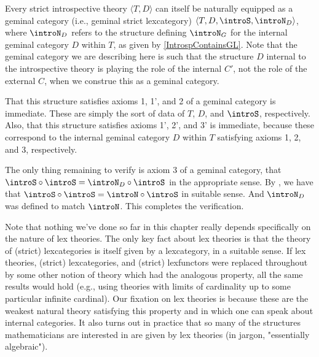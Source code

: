 \begin{construction}
Every strict introspective theory $\langle T, D \rangle$ can itself be naturally equipped as a geminal category (i.e., geminal strict lexcategory) $\langle T, D, \introS, \introN_{D} \rangle$, where $\introN_{D}$ refers to the structure defining $\introN_{G}$ for the internal geminal category $D$ within $T$, as given by \cref{IntrospContainsGL}. Note that the geminal category we are describing here is such that the structure $D$ internal to the introspective theory is playing the role of the internal $C'$, not the role of the external $C$, when we construe this as a geminal category.

That this structure satisfies axioms 1, 1', and 2 of a geminal category is immediate. These are simply the sort of data of $T$, $D$, and $\introS$, respectively. Also, that this structure satisfies axioms 1', 2', and 3' is immediate, because these correspond to the internal geminal category $D$ within $T$ satisfying axioms 1, 2, and 3, respectively.

The only thing remaining to verify is axiom 3 of a geminal category, that $\introS \circ \introS = \introN_{D} \circ \introS$ in the appropriate sense. By , we have that $\introS \circ \introS = \introN \circ \introS$ in suitable sense. And $\introN_{D}$ was defined to match $\introN$. This completes the verification.
\end{construction}

Note that nothing we've done so far in this chapter really depends specifically on the nature of lex theories. The only key fact about lex theories is that the theory of (strict) lexcategories is itself given by a lexcategory, in a suitable sense. If lex theories, (strict) lexcategories, and (strict) lexfunctors were replaced throughout by some other notion of theory which had the analogous property, all the same results would hold (e.g., using theories with limits of cardinality up to some particular infinite cardinal). Our fixation on lex theories is because these are the weakest natural theory satisfying this property and in which one can speak about internal categories. It also turns out in practice that so many of the structures mathematicians are interested in are given by lex theories (in jargon, "essentially algebraic").

